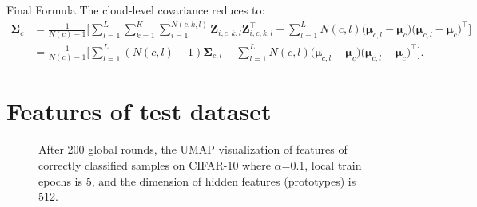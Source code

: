 \documentclass[journal]{IEEEtran}
\begin{document}
Final Formula
The cloud-level covariance reduces to:
\begin{align}
\mathbf{\Sigma}_c &= \frac{1}{N(c)-1} \Bigg[
\sum_{l=1}^L \sum_{k=1}^K \sum_{i=1}^{N(c,k,l)} \mathbf{Z}_{i,c,k,l} \mathbf{Z}_{i,c,k,l}^\top + 
\sum_{l=1}^L N(c,l) \big( \mathbf{\mu}_{c,l} - \mathbf{\mu}_c \big) \big( \mathbf{\mu}_{c,l} - \mathbf{\mu}_c \big)^\top
\Bigg] \nonumber \\
&= \frac{1}{N(c)-1} \Bigg[
\sum_{l=1}^L (N(c,l)-1) \mathbf{\Sigma}_{c,l} + 
\sum_{l=1}^L N(c,l) \big( \mathbf{\mu}_{c,l} - \mathbf{\mu}_c \big) \big( \mathbf{\mu}_{c,l} - \mathbf{\mu}_c \big)^\top
\Bigg].
\end{align}


\section{Features of test dataset}

\begin{figure*}[htbp]
    \centering



    \caption{After 200 global rounds, the UMAP visualization\cite{mcinnes2018umap-software} of features of correctly classified samples on CIFAR-10 where $\alpha$=0.1, local train epochs is 5, and the dimension of hidden features (prototypes) is 512.}
    \label{UMAP}
\end{figure*}
\end{document}
